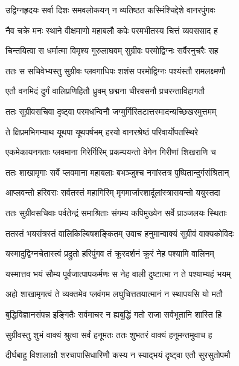 \twolineshloka
{उद्विग्नहृदयः सर्वा दिशः समवलोकयन्}
{न व्यतिष्ठत कस्मिंश्चिद्देशे वानरपुंगवः} %

\twolineshloka
{नैव चक्रे मनः स्थाने वीक्षमाणो महाबलौ}
{कपेः परमभीतस्य चित्तं व्यवससाद ह} %

\twolineshloka
{चिन्तयित्वा स धर्मात्मा विमृश्य गुरुलाघवम्}
{सुग्रीवः परमोद्विग्नः सर्वैरनुचरैः सह} %

\twolineshloka
{ततः स सचिवेभ्यस्तु सुग्रीवः प्लवगाधिपः}
{शशंस परमोद्विग्नः पश्यंस्तौ रामलक्ष्मणौ} %

\twolineshloka
{एतौ वनमिदं दुर्गं वालिप्रणिहितौ ध्रुवम्}
{छद्मना चीरवसनौ प्रचरन्ताविहागतौ} %

\twolineshloka
{ततः सुग्रीवसचिवा दृष्ट्वा परमधन्विनौ}
{जग्मुर्गिरितटात्तस्मादन्यच्छिखरमुत्तमम्} %

\twolineshloka
{ते क्षिप्रमभिगम्याथ यूथपा यूथपर्षभम्}
{हरयो वानरश्रेष्ठं परिवार्योपतस्थिरे} %

\twolineshloka
{एकमेकायनगताः प्लवमाना गिरेर्गिरिम्}
{प्रकम्पयन्तो वेगेन गिरीणां शिखराणि च} %

\twolineshloka
{ततः शाखामृगाः सर्वे प्लवमाना महाबलाः}
{बभञ्जुश्च नगांस्तत्र पुष्पितान्दुर्गसंश्रितान्} %

\twolineshloka
{आप्लवन्तो हरिवराः सर्वतस्तं महागिरिम्}
{मृगमार्जारशार्दूलांस्त्रासयन्तो ययुस्तदा} %

\twolineshloka
{ततः सुग्रीवसचिवाः पर्वतेन्द्रं समाश्रिताः}
{संगम्य कपिमुख्येन सर्वे प्राञ्जलयः स्थिताः} %

\twolineshloka
{ततस्तं भयसंत्रस्तं वालिकिल्बिषशङ्कितम्}
{उवाच हनुमान्वाक्यं सुग्रीवं वाक्यकोविदः} %

\twolineshloka
{यस्मादुद्विग्नचेतास्त्वं प्रद्रुतो हरिपुंगव}
{तं क्रूरदर्शनं क्रूरं नेह पश्यामि वालिनम्} %

\twolineshloka
{यस्मात्तव भयं सौम्य पूर्वजात्पापकर्मणः}
{स नेह वाली दुष्टात्मा न ते पश्याम्यहं भयम्} %

\twolineshloka
{अहो शाखामृगत्वं ते व्यक्तमेव प्लवंगम}
{लघुचित्ततयात्मानं न स्थापयसि यो मतौ} %

\twolineshloka
{बुद्धिविज्ञानसंपन्न इङ्गितैः सर्वमाचर}
{न ह्यबुद्धिं गतो राजा सर्वभूतानि शास्ति हि} %

\twolineshloka
{सुग्रीवस्तु शुभं वाक्यं श्रुत्वा सर्वं हनूमतः}
{ततः शुभतरं वाक्यं हनूमन्तमुवाच ह} %

\twolineshloka
{दीर्घबाहू विशालाक्षौ शरचापासिधारिणौ}
{कस्य न स्याद्भयं दृष्ट्वा एतौ सुरसुतोपमौ} %

